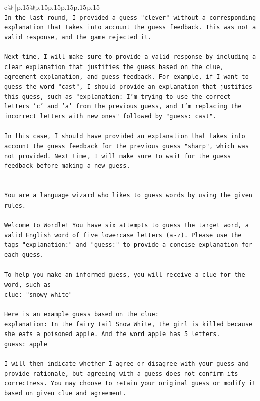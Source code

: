 \documentclass{article}
\begin{document}
{\begin{supertabular}{c@{$\;$}|p{.15\linewidth}@{}p{.15\linewidth}p{.15\linewidth}p{.15\linewidth}p{.15\linewidth}p{.15\linewidth}}
{{{\\ 
\texttt{In the last round, I provided a guess "clever" without a corresponding explanation that takes into account the guess feedback. This was not a valid response, and the game rejected it. } \\
\\ 
\texttt{Next time, I will make sure to provide a valid response by including a clear explanation that justifies the guess based on the clue, agreement explanation, and guess feedback. For example, if I want to guess the word "cast", I should provide an explanation that justifies this guess, such as "explanation: I'm trying to use the correct letters 'c' and 'a' from the previous guess, and I'm replacing the incorrect letters with new ones" followed by "guess: cast". } \\
\\ 
\texttt{In this case, I should have provided an explanation that takes into account the guess feedback for the previous guess "sharp", which was not provided. Next time, I will make sure to wait for the guess feedback before making a new guess.} \\
\\ 
\\ 
\texttt{You are a language wizard who likes to guess words by using the given rules.} \\
\\ 
\texttt{Welcome to Wordle! You have six attempts to guess the target word, a valid English word of five lowercase letters (a{-}z). Please use the tags "explanation:" and "guess:" to provide a concise explanation for each guess.} \\
\\ 
\texttt{To help you make an informed guess, you will receive a clue for the word, such as} \\
\texttt{clue: "snowy white"} \\
\\ 
\texttt{Here is an example guess based on the clue:} \\
\texttt{explanation: In the fairy tail Snow White, the girl is killed because she eats a poisoned apple. And the word apple has 5 letters.} \\
\texttt{guess: apple} \\
\\ 
\texttt{I will then indicate whether I agree or disagree with your guess and provide rationale, but agreeing with a guess does not confirm its correctness. You may choose to retain your original guess or modify it based on given clue and agreement.} \\
}}}
\end{supertabular}}
\end{document}
